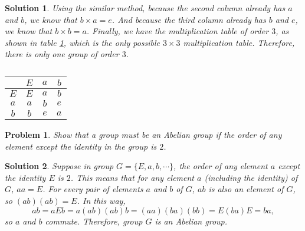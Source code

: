 \documentclass[UTF8,10pt,a4paper]{article}
\theoremstyle{Problem}
\newtheorem{prob}{Problem}
\theoremstyle{Solution}
\newtheorem*{sol}{Solution}
\begin{document}
\begin{sol}
    Using the similar method, because the second column already has $a$ and $b$, we know that $b\times a=e$. And because the third column already has $b$ and $e$, we know that $b\times b=a$. Finally, we have the multiplication table of order $3$, as shown in table \ref{3-multiplication-table-4}, which is the only possible $3\times 3$ multiplication table. Therefore, there is only one group of order $3$.
    \begin{table}[h]
        \centering
        \caption{}
        \label{3-multiplication-table-4}
        \begin{tabular}{c|ccc}
                & $E$ & $a$ & $b$ \\ \hline
            $E$ & $E$ & $a$ & $b$ \\
            $a$ & $a$ & $b$ & $e$ \\
            $b$ & $b$ & $e$ & $a$
        \end{tabular}
    \end{table}
\end{sol}

\begin{prob}
    Show that a group must be an Abelian group if the order of any element except the identity in the group is $2$.
\end{prob}
\begin{sol}
    Suppose in group $G=\{E,a,b,\cdots\}$, the order of any element $a$ except the identity $E$ is $2$. This means that for any element $a$ (including the identity) of $G$, $aa=E$. For every pair of elements $a$ and $b$ of $G$, $ab$ is also an element of $G$, so $(ab)(ab)=E$. In this way,
    \begin{equation}
        ab=aEb=a(ab)(ab)b=(aa)(ba)(bb)=E(ba)E=ba,
    \end{equation}
    so $a$ and $b$ commute. Therefore, group $G$ is an Abelian group.
\end{sol}
\end{document}
